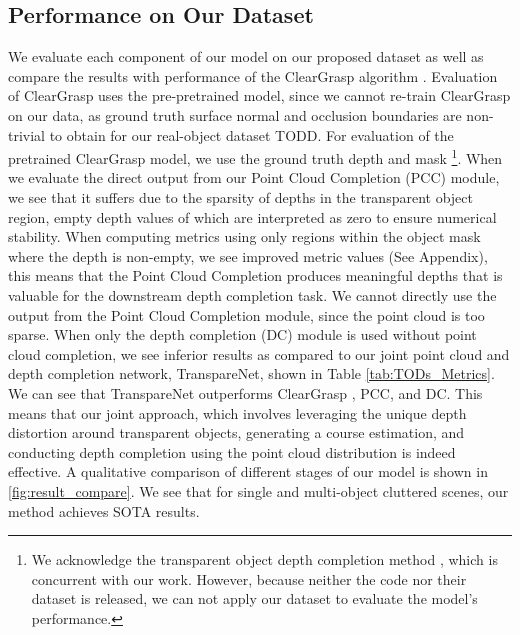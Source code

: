 \documentclass{article}
\newcommand{\algoName}{TranspareNet\xspace}
\newcommand{\dataName}{TODD}
\begin{document}
\subsection{Performance on Our Dataset}
We evaluate each component of our model on our proposed dataset as well as compare the results with performance of the ClearGrasp algorithm \citep{ClearGrasp}. Evaluation of ClearGrasp uses the pre-pretrained model, since we cannot re-train ClearGrasp \cite{ClearGrasp} on our data, as ground truth surface normal and occlusion boundaries are non-trivial to obtain for our real-object dataset \dataName. For evaluation of the pretrained ClearGrasp model, we use the ground truth depth and mask \footnote{We acknowledge the transparent object depth completion method \citep{zhu2021rgbd}, which is concurrent with our work. However, because neither the code nor their dataset is released, we can not apply our dataset to evaluate the model's performance.}.  When we evaluate the direct output from our Point Cloud Completion (PCC) module, we see that it suffers due to the sparsity of depths in the transparent object region, empty depth values of which are interpreted as zero to ensure numerical stability. When computing metrics using only regions within the object mask where the depth is non-empty, we see improved metric values (See Appendix), this means that the Point Cloud Completion produces meaningful depths that is valuable for the downstream depth completion task. We cannot directly use the output from the Point Cloud Completion module, since the point cloud is too sparse. When only the depth completion (DC) module is used without point cloud completion, we see inferior results as compared to our joint point cloud and depth completion network, \algoName, shown in Table \ref{tab:TODs_Metrics}. We can see that \algoName outperforms ClearGrasp \citep{ClearGrasp}, PCC, and DC. This means that our joint approach, which involves leveraging the unique depth distortion around transparent objects, generating a course estimation, and conducting depth completion using the point cloud distribution is indeed effective. A qualitative comparison of different stages of our model is shown in \autoref{fig:result_compare}. We see that for single and multi-object cluttered scenes, our method achieves SOTA results. 
\end{document}
